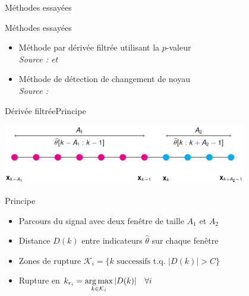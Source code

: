 \begin{frame}{Méthodes essayées}

\begin{alertblock}{Méthodes essayées}
\begin{itemize}
\item Méthode par dérivée filtrée utilisant la $p$-valeur\\
\textit{Source : \cite{Bertrand11} et \cite{Herault14}}
\item Méthode de détection de changement de noyau\\
\textit{Source : \cite{Desobry05}}
\end{itemize}
\end{alertblock}

\end{frame}


\begin{frame}{Dérivée filtrée}{Principe}

\begin{center}
\includegraphics[width=0.8\textwidth]{images/deriveeFiltree}
\end{center}

\begin{block}{Principe}
\begin{itemize}
\item Parcours du signal avec deux fenêtre de taille $A_1$ et $A_2$
\item Distance $D(k)$ entre indicateurs $\hat{\theta}$ sur chaque fenêtre
\item Zones de rupture $\mathcal{K}_i = \{k \text{ successifs t.q. } |D(k)| > C\}$
\item Rupture en $k_{r_i} = \displaystyle \operatorname*{arg\,max}_{k \in \mathcal{K}_i} |D(k)| \hspace{1em}\forall i$
\end{itemize}
\end{block}


\end{frame}

